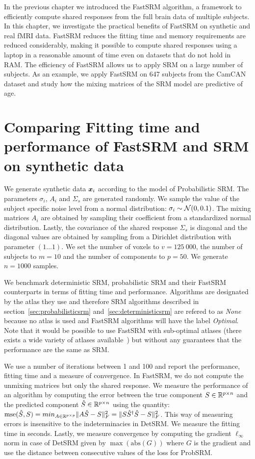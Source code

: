 In the previous chapter we introduced the FastSRM algorithm, a framework to
efficiently compute shared responses from the full brain data of multiple
subjects. In this chapter, we
investigate the practical benefits of FastSRM on synthetic and real fMRI data.
FastSRM reduces the fitting time
and memory requirements are reduced considerably, making it possible to compute
shared responses using a laptop in a reasonable amount of time even on
datasets that do not hold in RAM. The efficiency of FastSRM allows us to apply
SRM on a large number of subjects. As an example, we apply FastSRM on 647
subjects from the CamCAN dataset and study how the mixing matrices of the SRM
model are predictive of age.


\section{Comparing Fitting time and performance of FastSRM and
  SRM on synthetic data}
We generate synthetic data $\boldsymbol{x}_i$ according to the model of Probabilistic SRM.
The parameters $\sigma_i$, $A_i$ and $\Sigma_s$ are generated randomly. We sample the value of the subject specific noise level from a normal
distribution: $\sigma_i \sim \mathcal{N}(0, 0.1)$. The mixing matrices $A_i$
are obtained by sampling their coefficient from a standardized normal distribution.
Lastly, the covariance of the shared response $\Sigma_s$ is diagonal and the
diagonal values are obtained by sampling from a Dirichlet distribution with
parameter $(1 \dots 1)$.
We set the number of voxels to $v=125~000$, the number of subjects to $m=10$ and
the number of components to $p=50$. We generate $n=1000$ samples.

We benchmark deterministic SRM, probabilistic
SRM and their FastSRM counterparts in terms of fitting time and performance.
Algorithms are designated by the atlas they use and therefore SRM algorithms described in
section~\ref{sec:probabilisticsrm} and~\ref{sec:deterministicsrm} are refered to
as \emph{None} because no atlas is used and FastSRM algorithms will have the
label \emph{Optimal}. Note that it would be possible to use FastSRM with sub-optimal
atlases (there exists a wide variety of atlases
available~\cite{schaefer2017local, bellec2010multi, mensch2018extracting}) but
without any guarantees that the performance are the same as SRM.


We use a number of iterations between 1 and 100 and report the performance,
fitting time and a measure of convergence. In FastSRM, we do not compute the
unmixing matrices but only the shared response.
We measure the performance of an algorithm by computing the error between the true component $S \in \mathbb{R}^{p \times n}$ and
the predicted component $\hat{S} \in \mathbb{R}^{p \times n}$ using the quantity:
$\mathrm{mse}(\hat{S}, S) = min_{A \in \mathbb{R}^{p \times p}} \|A \hat{S} - S \|^2_F =  \|S
\hat{S}^{\dagger}\hat{S} - S \|^2_F$. This way of measuring errors is
insensitive to the indeterminacies in DetSRM.
We measure the fitting time in seconds.
Lastly, we measure convergence by computing the gradient $\ell_{\infty}$ norm in
case of DetSRM given by $\max(\mathrm{abs}(G))$ where $G$ is the gradient and
use the distance between consecutive values of the loss for ProbSRM.


